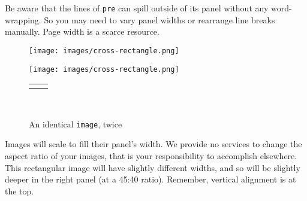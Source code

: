 \documentclass[10pt,]{article}
\theoremstyle{plain}
\theoremstyle{definition}
\theoremstyle{definition}
\theoremstyle{definition}
\theoremstyle{definition}
\theoremstyle{definition}
\theoremstyle{definition}
\numberwithin{equation}{section}
\newlength{\panelmax}
\begin{document}
\hypertarget{p-747}{}%
Be aware that the lines of \lstinline?pre? can spill outside of its panel without any word-wrapping.  So you may need to vary panel widths or rearrange line breaks manually.  Page width is a scarce resource.%
\begin{figure}
\centering
{%
\setlength{\panelmax}{0pt}
\ifdefined\panelboxAimage\else\newsavebox{\panelboxAimage}\fi%
\begin{lrbox}{\panelboxAimage}
\texttt{[image: images/cross-rectangle.png]}
\end{lrbox}
\ifdefined\phAimage\else\newlength{\phAimage}\fi%
\setlength{\phAimage}{\ht\panelboxAimage+\dp\panelboxAimage}
\settototalheight{\phAimage}{\usebox{\panelboxAimage}}
\setlength{\panelmax}{\maxof{\panelmax}{\phAimage}}
\ifdefined\panelboxBimage\else\newsavebox{\panelboxBimage}\fi%
\begin{lrbox}{\panelboxBimage}
\texttt{[image: images/cross-rectangle.png]}
\end{lrbox}
\ifdefined\phBimage\else\newlength{\phBimage}\fi%
\setlength{\phBimage}{\ht\panelboxBimage+\dp\panelboxBimage}
\settototalheight{\phBimage}{\usebox{\panelboxBimage}}
\setlength{\panelmax}{\maxof{\panelmax}{\phBimage}}
\leavevmode%
\setlength{\tabcolsep}{0.025\linewidth}
\par\medskip\noindent
\hspace*{0.05\linewidth}%
\begin{tabular}{@{}*{2}{c}@{}}
\begin{minipage}[c][\panelmax][t]{0.4\linewidth}\usebox{\panelboxAimage}\end{minipage}&
\begin{minipage}[c][\panelmax][t]{0.45\linewidth}\usebox{\panelboxBimage}\end{minipage}\end{tabular}\\
}%
\caption{An identical \lstinline?image?, twice\label{figure-119}}
\end{figure}
\hypertarget{p-748}{}%
Images will scale to fill their panel's width.  We provide no services to change the aspect ratio of your images, that is your responsibility to accomplish elsewhere.  This rectangular image will have slightly different widths, and so will be slightly deeper in the right panel (at a 45:40 ratio).  Remember, vertical alignment is at the top.%
\end{document}
